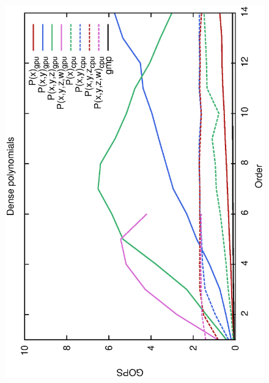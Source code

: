 \documentclass[oribibl]{llncs2e/llncs}
\begin{document}
\begin{figure}[t!]
\begin{center}
\mbox{
\hspace{-0.5cm}
\includegraphics[scale=0.37, angle=-90]{ME128.eps} 
\hspace{-0.4cm}
}
\end{center}
\end{figure}
\end{document}

